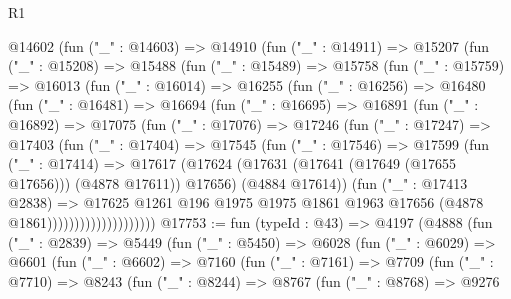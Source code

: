 \begin{lexlean}{R1}
\begin{coremodule}
          @14602
            (fun ("_" : @14603) =>
            @14910
              (fun ("_" : @14911) =>
              @15207
                (fun ("_" : @15208) =>
                @15488
                  (fun ("_" : @15489) =>
                  @15758
                    (fun ("_" : @15759) =>
                    @16013
                      (fun ("_" : @16014) =>
                      @16255
                        (fun ("_" : @16256) =>
                        @16480
                          (fun ("_" : @16481) =>
                          @16694
                            (fun ("_" : @16695) =>
                            @16891
                              (fun ("_" : @16892) =>
                              @17075
                                (fun ("_" : @17076) =>
                                @17246
                                  (fun ("_" : @17247) =>
                                  @17403
                                    (fun ("_" : @17404) =>
                                    @17545
                                      (fun ("_" : @17546) =>
                                      @17599
                                        (fun ("_" : @17414) =>
                                        @17617
                                          (@17624
                                            (@17631
                                              (@17641 (@17649 (@17655 @17656)))
                                              (@4878 @17611))
                                            @17656)
                                          (@4884 @17614))
                                        (fun ("_" : @17413 @2838) =>
                                        @17625
                                          @1261
                                          @196
                                          @1975
                                          @1975
                                          @1861
                                          @1963
                                          @17656
                                          (@4878 @1861))))))))))))))))))))
@17753 := fun (typeId : @43) =>
  @4197
    (@4888
      (fun ("_" : @2839) =>
      @5449
        (fun ("_" : @5450) =>
        @6028
          (fun ("_" : @6029) =>
          @6601
            (fun ("_" : @6602) =>
            @7160
              (fun ("_" : @7161) =>
              @7709
                (fun ("_" : @7710) =>
                @8243
                  (fun ("_" : @8244) =>
                  @8767
                    (fun ("_" : @8768) =>
                    @9276

\end{coremodule}
\end{lexlean}
